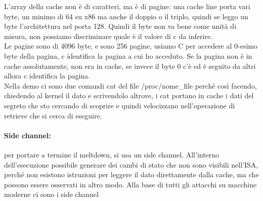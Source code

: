 \documentclass[14pt]{article}
\begin{document}
L'array della cache non è di caratteri, ma è di pagine: una cache line porta vari byte, un minimo di 64 su x86 ma anche il doppio o il triplo, quindi se leggo un byte l'architettura nel porta 128. Quindi il byte non va bene come unità di misura, non possiamo discriminare quale è il valore di c da inferire.\\ Le pagine sono di 4096 byte, e sono 256 pagine, usiamo C per accedere al 0-esimo byte della pagina, c identifica la pagina a cui ho acceduto. Se la pagina non è in cache assolutamente, non era in cache, se invece il byte 0 c'è ed è seguito da altri allora c identifica la pagina.\\ Nella demo ci sono due comandi cat del file /proc/nome\_file perché così facendo, chiedendo al kernel il dato e scrivendolo altrove, i cat portano in cache i dati del segreto che sto cercando di scoprire e quindi velocizzano nell'operazione di retrieve che si cerca di eseguire.
\paragraph{Side channel:}per portare a termine il meltdown, si usa un side channel. All'interno dell'esecuzione  possibile generare dei cambi di stato che non sono visibili nell'ISA, perché non esistono istruzioni per leggere il dato direttamente dalla cache, ma che possono essere osservati in altro modo. Alla base di tutti gli attacchi su macchine moderne ci sono i side channel
\end{document}

